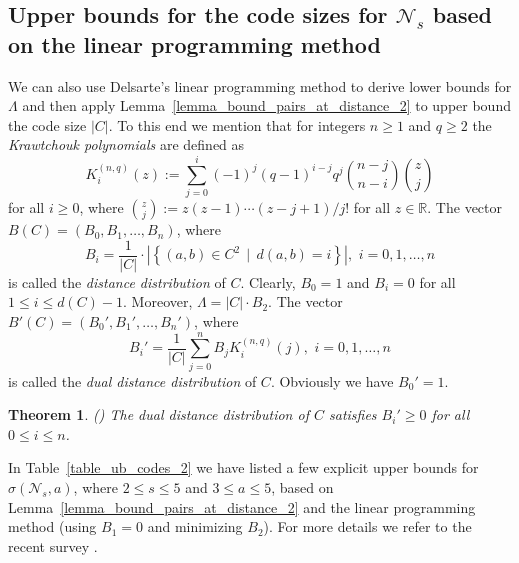 \documentclass[11pt]{article}
\newcommand{\cN}{\mathcal{N}}
\newtheorem{theorem}{Theorem}
\begin{document}
\subsection{Upper bounds for the code sizes for $\cN_s$ based on the linear programming method}
\label{subsec_linear_programming_method}
We can also use Delsarte's linear programming method to derive lower bounds for $\Lambda$ and then apply Lemma~\ref{lemma_bound_pairs_at_distance_2} to upper bound the code 
size $|C|$. To this end we mention that for integers $n\ge 1$ and $q\ge 2$ the \emph{Krawtchouk polynomials} are defined as 
\begin{equation}
  K_i^{(n,q)}(z):=\sum_{j=0}^i (-1)^j (q-1)^{i-j} q^j {{n-j}\choose {n-i}}{z\choose j}
\end{equation}
for all $i\ge 0$, where ${z\choose j}:=z(z-1)\cdots (z-j+1)/j!$ for all $z\in\mathbb{R}$.  The vector $B(C) = \left(B_0, B_1,\dots, B_n\right)$, 
where
\begin{equation}
  B_i = \frac{1}{|C|} \cdot\left|\left\{(a,b)\in C^2\,\mid\, d(a,b)=i\right\}\right|, \,\,i=0,1,\dots,n 
\end{equation}
is called the \emph{distance distribution} of $C$. Clearly, $B_0 = 1$ and $B_i = 0$ for all $1\le i\le d(C)-1$. Moreover, $\Lambda=|C|\cdot B_2$.   
The vector $B'(C)=\left(B_0',B_1',\dots,B_n'\right)$, where
\begin{equation}
  B_i'=\frac{1}{|C|} \sum_{j=0}^n B_jK_i^{(n,q)}(j), \,\,i=0,1,\dots,n
\end{equation}
is called the \emph{dual distance distribution} of $C$. %
Obviously we have $B_0'=1$. 

\begin{theorem} (\cite{delsarte1973algebraic,delsarte1973four}) 
  The dual distance distribution of $C$ satisfies $B_i'\ge 0$ for all $0\le i\le n$.
\end{theorem}  
In Table~\ref{table_ub_codes_2} we have listed a few explicit upper bounds for $\sigma(\cN_s,a)$, where $2\le s\le 5$ and $3\le a\le 5$,  
based on Lemma~\ref{lemma_bound_pairs_at_distance_2} and the linear programming method (using $B_1=0$ and 
minimizing $B_2$). For more details we refer to the recent survey \cite{boyvalenkov2021linear}.
\end{document}
